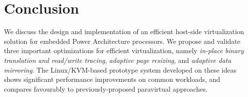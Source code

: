 \documentclass[10pt,twocolumn]{article}
\begin{document}
\section{Conclusion}
We discuss the design and implementation of an efficient host-side virtualization
solution
for embedded Power Architecture processors. We propose and validate three important
optimizations
for efficient virtualization, namely {\em in-place binary translation and read/write
tracing}, {\em adaptive page resizing}, and {\em adaptive data mirroring}. 
The Linux/KVM-based prototype system developed on these ideas shows significant
performance improvements on common workloads, and compares favourably to
previously-proposed paravirtual approaches.


\end{document}

